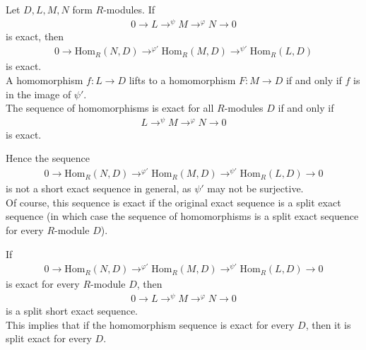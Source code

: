 \documentclass{memoir}
\begin{document}
\begin{thm}
	Let \(D,L,M,N\) form \(R\)-modules. If
	\begin{align*}
		0 \to L \to^{\psi }M \to^{\varphi }N \to 0
	\end{align*}
	is exact, then
	\begin{align*}
		0 \to \textrm{Hom}_R(N,D) \to^{\varphi '} \textrm{Hom}_R(M,D) \to^{\psi'} \textrm{Hom}_R(L,D)
	\end{align*} is exact.\\

	A homomorphism \(f:L\to D\) lifts to a homomorphism \(F:M\to D\) if and only if \(f\) is in the image of \(\psi '\).\\

	The sequence of homomorphisms is exact for all \(R\)-modules \(D\) if and only if
	\begin{align*}
		L \to^{\psi }M \to^{\varphi }N \to 0
	\end{align*}
	is exact.
\end{thm}
Hence the sequence
\begin{align*}
	0 \to \textrm{Hom}_R(N,D) \to^{\varphi '}\textrm{Hom}_R(M,D) \to^{\psi '}\textrm{Hom}_R(L,D) \to 0
\end{align*} is not a short exact sequence in general, as \(\psi '\) may not be surjective.\\

Of course, this sequence is exact if the original exact sequence is a split exact sequence (in which case the sequence of homomorphisms is a split exact sequence for every \(R\)-module \(D\)).

\begin{hw}
	If 
	\begin{align*}
		0 \to \textrm{Hom}_R(N,D) \to^{\varphi '}\textrm{Hom}_R(M,D) \to^{\psi '}\textrm{Hom}_R(L,D) \to 0
	\end{align*}
	is exact for every \(R\)-module \(D\), then
	\begin{align*}
		0 \to L \to^{\psi }M \to^{\varphi }N \to 0
	\end{align*}
	is a split short exact sequence.\\

	This implies that if the homomorphism sequence is exact for every \(D\), then it is split exact for every \(D\).
\end{hw}
\end{document}
